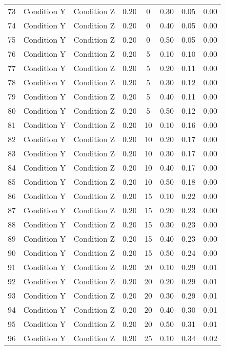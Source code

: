 \begin{landscape}
\begin{longtable}{cc cc cc cc}
  73 & Condition Y & Condition Z & 0.20 &   0 & 0.30 & 0.05 & 0.00 \\ 
  74 & Condition Y & Condition Z & 0.20 &   0 & 0.40 & 0.05 & 0.00 \\ 
  75 & Condition Y & Condition Z & 0.20 &   0 & 0.50 & 0.05 & 0.00 \\ 
  76 & Condition Y & Condition Z & 0.20 &   5 & 0.10 & 0.10 & 0.00 \\ 
  77 & Condition Y & Condition Z & 0.20 &   5 & 0.20 & 0.11 & 0.00 \\ 
  78 & Condition Y & Condition Z & 0.20 &   5 & 0.30 & 0.12 & 0.00 \\ 
  79 & Condition Y & Condition Z & 0.20 &   5 & 0.40 & 0.11 & 0.00 \\ 
  80 & Condition Y & Condition Z & 0.20 &   5 & 0.50 & 0.12 & 0.00 \\ 
  81 & Condition Y & Condition Z & 0.20 &  10 & 0.10 & 0.16 & 0.00 \\ 
  82 & Condition Y & Condition Z & 0.20 &  10 & 0.20 & 0.17 & 0.00 \\ 
  83 & Condition Y & Condition Z & 0.20 &  10 & 0.30 & 0.17 & 0.00 \\ 
  84 & Condition Y & Condition Z & 0.20 &  10 & 0.40 & 0.17 & 0.00 \\ 
  85 & Condition Y & Condition Z & 0.20 &  10 & 0.50 & 0.18 & 0.00 \\ 
  86 & Condition Y & Condition Z & 0.20 &  15 & 0.10 & 0.22 & 0.00 \\ 
  87 & Condition Y & Condition Z & 0.20 &  15 & 0.20 & 0.23 & 0.00 \\ 
  88 & Condition Y & Condition Z & 0.20 &  15 & 0.30 & 0.23 & 0.00 \\ 
  89 & Condition Y & Condition Z & 0.20 &  15 & 0.40 & 0.23 & 0.00 \\ 
  90 & Condition Y & Condition Z & 0.20 &  15 & 0.50 & 0.24 & 0.00 \\ 
  91 & Condition Y & Condition Z & 0.20 &  20 & 0.10 & 0.29 & 0.01 \\ 
  92 & Condition Y & Condition Z & 0.20 &  20 & 0.20 & 0.29 & 0.01 \\ 
  93 & Condition Y & Condition Z & 0.20 &  20 & 0.30 & 0.29 & 0.01 \\ 
  94 & Condition Y & Condition Z & 0.20 &  20 & 0.40 & 0.30 & 0.01 \\ 
  95 & Condition Y & Condition Z & 0.20 &  20 & 0.50 & 0.31 & 0.01 \\ 
  96 & Condition Y & Condition Z & 0.20 &  25 & 0.10 & 0.34 & 0.02 \\ 

\end{longtable}
\end{landscape}
